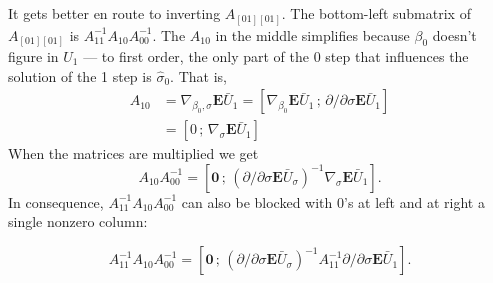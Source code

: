 \documentclass[12pt]{article}
\newcommand{\EE}{\mathbf{E}}
\begin{document}
It gets better en route to inverting $A_{[01][01]}$. The bottom-left
submatrix of $A_{[01][01]}$ is $A_{11}^{-1} A_{10} A_{00}^{-1}$.  The
$A_{10}$ in the middle simplifies because $\beta_{0}$ doesn't figure
in $U_{1}$ --- to first order, the only part of the 0 step that
influences the solution of the 1 step is $\hat{\sigma}_{0}$.   That
is, 
\begin{align*}
  A_{10} &= \nabla_{\beta_{0}, \sigma} \EE \bar{U}_{1}  = 
                                                              [\nabla_{\beta_{0}}
                                                              \EE
                                                              \bar{U}_{1}
                                                              \, ; \,
                                                              \partial/{\partial \sigma}
                                                              \EE
                                                              \bar{U}_{1}
                                                              ] \\
&= [ 0\, ; \, \nabla_{\sigma} \EE \bar{U}_{1} ]
\end{align*}
When the matrices are multiplied we get
\begin{equation*}
  A_{10}A_{00}^{-1} = \left[ \mathbf{0} \, ; \,  (\partial/{\partial \sigma} \EE \bar{U}_{\sigma})^{-1}\nabla_{\sigma} \EE \bar{U}_{1} \right] .
\end{equation*}
In consequence, $A_{11}^{-1} A_{10} A_{00}^{-1}$ can also be blocked with
0's at left and at right a single nonzero column:

\begin{equation*}
A_{11}^{-1} A_{10}A_{00}^{-1} =  [ \mathbf{0} \, ; \, (\partial/{\partial \sigma} \EE \bar{U}_{\sigma})^{-1}
A_{11}^{-1} \partial/{\partial \sigma}\EE \bar{U}_{1} ].
\end{equation*}
\end{document}
